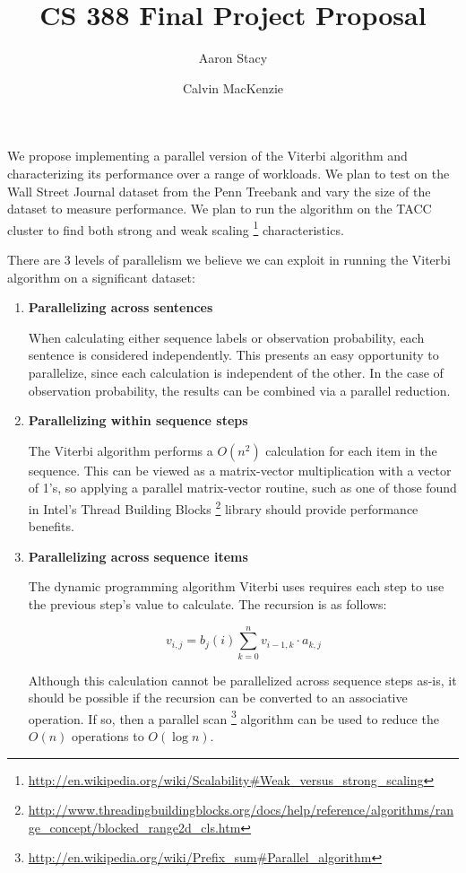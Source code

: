 \documentclass[11pt,onecolumn]{article}
\begin{document}
\title{CS 388 Final Project Proposal}

\author{
 Aaron Stacy\\
\and
 Calvin MacKenzie\\
}

\maketitle

\noindent We propose implementing a parallel version of the Viterbi algorithm and characterizing its performance over a range of workloads. We plan to test on the Wall Street Journal dataset from the Penn Treebank and vary the size of the dataset to measure performance. We plan to run the algorithm on the TACC cluster to find both strong and weak scaling \footnote{\url{http://en.wikipedia.org/wiki/Scalability#Weak_versus_strong_scaling}} characteristics.

\vspace{.4cm}

\noindent There are 3 levels of parallelism we believe we can exploit in running the Viterbi algorithm on a significant dataset:

\begin{enumerate}
\item {\bf Parallelizing across sentences}

When calculating either sequence labels or observation probability, each sentence is considered independently. This presents an easy opportunity to parallelize, since each calculation is independent of the other. In the case of observation probability, the results can be combined via a parallel reduction.

\item {\bf Parallelizing within sequence steps}

The Viterbi algorithm performs a $O(n^2)$ calculation for each item in the sequence. This can be viewed as a matrix-vector multiplication with a vector of 1's, so applying a parallel matrix-vector routine, such as one of those found in Intel's Thread Building Blocks \footnote{\url{http://www.threadingbuildingblocks.org/docs/help/reference/algorithms/range_concept/blocked_range2d_cls.htm}} library should provide performance benefits.

\item {\bf Parallelizing across sequence items}

The dynamic programming algorithm Viterbi uses requires each step to use the previous step's value to calculate. The recursion is as follows:

\begin{equation}
v_{i,j} = b_j(i) \sum_{k=0}^{n} v_{i-1,k} \cdot a_{k,j}
\end{equation}

Although this calculation cannot be parallelized across sequence steps as-is, it should be possible if the recursion can be converted to an associative operation. If so, then a parallel scan \footnote{\url{http://en.wikipedia.org/wiki/Prefix_sum#Parallel_algorithm}} algorithm can be used to reduce the $O(n)$ operations to $O(\log n)$.

\end{enumerate}
\end{document}
